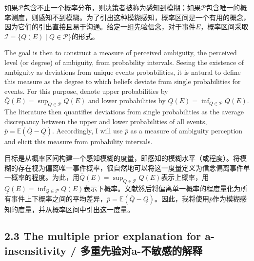 \documentclass[12pt,a4paper]{article}
\newenvironment{original}
  {\par\medskip\noindent\color{black}\ignorespaces}
  {\par\medskip}
\newenvironment{translation}
  {\par\noindent\color{transblue}\ignorespaces}
  {\par\medskip\medskip}
\begin{document}
\begin{translation}
如果$\mathcal{P}$包含不止一个概率分布，则决策者被称为感知到模糊；如果$\mathcal{P}$包含唯一的概率测度，则感知不到模糊。为了引出这种模糊感知，概率区间是一个有用的概念，因为它们的引出直接且易于沟通。给定一组先验信念，对于事件$E$，概率区间采取$\mathcal{I} = \{Q(E) \mid Q \in \mathcal{P}\}$的形式。
\end{translation}

\begin{original}
The goal is then to construct a measure of perceived ambiguity, the perceived level (or degree) of ambiguity, from probability intervals. Seeing the existence of ambiguity as deviations from unique events probabilities, it is natural to define this measure as the degree to which beliefs deviate from single probabilities for events. For this purpose, denote upper probabilities by $\overline{Q}(E) = \sup_{Q \in \mathcal{P}} Q(E)$ and lower probabilities by $\underline{Q}(E) = \inf_{Q \in \mathcal{P}} Q(E)$. The literature then quantifies deviations from single probabilities as the average discrepancy between the upper and lower probabilities of all events, $\bar{p} = \mathbb{E}(\overline{Q} - \underline{Q})$. Accordingly, I will use $\bar{p}$ as a measure of ambiguity perception and elicit this measure from probability intervals.
\end{original}

\begin{translation}
目标是从概率区间构建一个感知模糊的度量，即感知的模糊水平（或程度）。将模糊的存在视为偏离唯一事件概率，很自然地可以将这一度量定义为信念偏离事件单一概率的程度。为此，用$\overline{Q}(E) = \sup_{Q \in \mathcal{P}} Q(E)$表示上概率，用$\underline{Q}(E) = \inf_{Q \in \mathcal{P}} Q(E)$表示下概率。文献然后将偏离单一概率的程度量化为所有事件上下概率之间的平均差异，$\bar{p} = \mathbb{E}(\overline{Q} - \underline{Q})$。因此，我将使用$\bar{p}$作为模糊感知的度量，并从概率区间中引出这一度量。
\end{translation}

\subsection{2.3 The multiple prior explanation for a-insensitivity / 多重先验对a-不敏感的解释}
\end{document}
